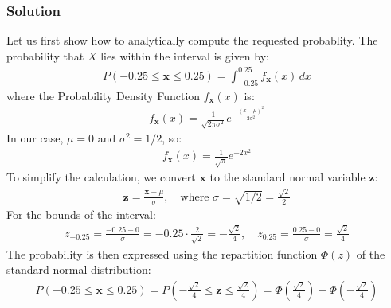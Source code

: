 \documentclass[letterpaper,10pt,english]{jupyterBook}
\begin{document}
\subsubsection{Solution}
\label{\detokenize{01:id3}}
\sphinxAtStartPar
Let us first show how to analytically compute the requested probablity.
The probability that \(X\) lies within the interval is given by:
\begin{equation*}
\begin{split}P(-0.25 \leq \mathbf x \leq 0.25) = \int_{-0.25}^{0.25} f_{\mathbf x}(x) \, dx\end{split}
\end{equation*}
\sphinxAtStartPar
where the Probability Density Function \(f_{\mathbf x}(x)\) is:
\begin{equation*}
\begin{split}f_{\mathbf x}(x) = \frac{1}{\sqrt{2 \pi \sigma^2}} e^{-\frac{(x - \mu)^2}{2 \sigma^2}}\end{split}
\end{equation*}
\sphinxAtStartPar
In our case, \(\mu = 0\) and \(\sigma^2 = 1/2\), so:
\begin{equation*}
\begin{split}f_{\mathbf x}(x) = \frac{1}{\sqrt{\pi}} e^{-2x^2}\end{split}
\end{equation*}
\sphinxAtStartPar
To simplify the calculation, we convert \(\mathbf x\) to the standard normal variable \(\mathbf z\):
\begin{equation*}
\begin{split}\mathbf z = \frac{\mathbf x - \mu}{\sigma}, \quad \text{where } \sigma = \sqrt{1/2} = \frac{\sqrt{2}}{2}\end{split}
\end{equation*}
\sphinxAtStartPar
For the bounds of the interval:
\begin{equation*}
\begin{split}z_{-0.25} = \frac{-0.25 - 0}{\sigma} = -0.25 \cdot \frac{2}{\sqrt{2}} = -\frac{\sqrt{2}}{4}, \quad
z_{0.25} = \frac{0.25 - 0}{\sigma} = \frac{\sqrt{2}}{4}\end{split}
\end{equation*}
\sphinxAtStartPar
The probability is then expressed using the repartition function \(\Phi(z)\) of the standard normal distribution:
\begin{equation*}
\begin{split}P(-0.25 \leq \mathbf x \leq 0.25) = P\left(-\frac{\sqrt{2}}{4} \leq \mathbf z \leq \frac{\sqrt{2}}{4}\right) = \Phi\left(\frac{\sqrt{2}}{4}\right) - \Phi\left(-\frac{\sqrt{2}}{4}\right)\end{split}
\end{equation*}
\end{document}
